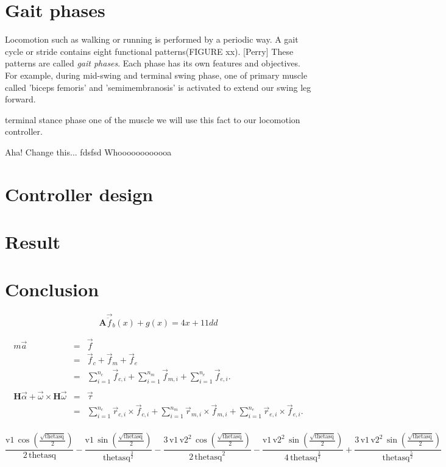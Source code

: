 \documentclass[a4paper,10pt]{article}
\begin{document}
\section{Gait phases}

Locomotion such as walking or running is performed by a periodic way.
A gait cycle or stride contains eight functional patterns(FIGURE xx).
[Perry] These patterns are called \emph{gait phases}. Each phase has its
own features and objectives. For example, during mid-swing and terminal swing
phase, one of primary muscle called 'biceps femoris' and 'semimembranosis' is
activated to extend our swing leg forward.

terminal stance phase one
of the muscle  we will use this fact
to our locomotion controller.

Aha!
Change this...
fdsfsd
Whoooooooooooa~
\section{Controller design}


\section{Result}

\section{Conclusion}


\begin{equation}
\mathbf{A}\vec{\ddot{f}}_b(x) + g(x) = 4x + 11dd
\end{equation}

\begin{eqnarray*}
m\vec{a} & = & \vec{f} \\
         & = & \vec{f}_c+\vec{f}_m+\vec{f}_e \\
         & = & \sum_{i=1}^{n_c}{\vec{f}_{c,i}} + \sum_{i=1}^{n_m}{\vec{f}_{m,i}} + \sum_{i=1}^{n_e}{\vec{f}_{e,i}}. \\
\\
\mathbf{H}\vec\alpha + \vec\omega\times\mathbf{H}\vec\omega
         & = & \vec\tau \\
         & = & \sum_{i=1}^{n_c}{\vec{r}_{c,i}\times\vec{f}_{c,i}} + \sum_{i=1}^{n_m}{\vec{r}_{m,i}\times\vec{f}_{m,i}} + \sum_{i=1}^{n_e}{\vec{r}_{e,i}\times\vec{f}_{e,i}}. \\
\end{eqnarray*}

\begin{equation}
\frac{\mathrm{v1}\, \cos\!\left(\frac{\sqrt{\mathrm{thetasq}}}{2}\right)}{2\, \mathrm{thetasq}} - \frac{\mathrm{v1}\, \sin\!\left(\frac{\sqrt{\mathrm{thetasq}}}{2}\right)}{{\mathrm{thetasq}}^{\frac{3}{2}}} - \frac{3\, \mathrm{v1}\, {\mathrm{v2}}^2\, \cos\!\left(\frac{\sqrt{\mathrm{thetasq}}}{2}\right)}{2\, {\mathrm{thetasq}}^2} - \frac{\mathrm{v1}\, {\mathrm{v2}}^2\, \sin\!\left(\frac{\sqrt{\mathrm{thetasq}}}{2}\right)}{4\, {\mathrm{thetasq}}^{\frac{3}{2}}} + \frac{3\, \mathrm{v1}\, {\mathrm{v2}}^2\, \sin\!\left(\frac{\sqrt{\mathrm{thetasq}}}{2}\right)}{{\mathrm{thetasq}}^{\frac{5}{2}}}
\end{equation}
\end{document}
